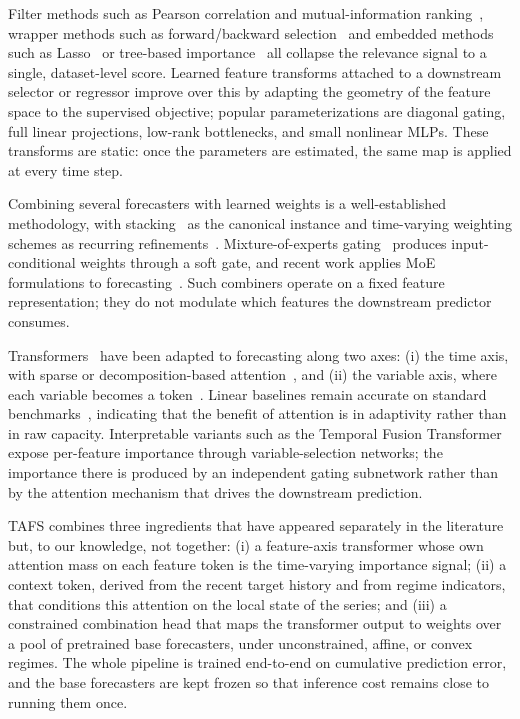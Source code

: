 \documentclass[journal]{IEEEtran}
\begin{document}
Filter methods such as Pearson correlation and mutual-information ranking~\cite{cover1991ifs}, wrapper methods such as forward/backward selection~\cite{guyon2003introfs} and embedded methods such as Lasso~\cite{tibshirani1996lasso} or tree-based importance~\cite{breiman2001randomforest} all collapse the relevance signal to a single, dataset-level score. Learned feature transforms attached to a downstream selector or regressor improve over this by adapting the geometry of the feature space to the supervised objective; popular parameterizations are diagonal gating, full linear projections, low-rank bottlenecks, and small nonlinear MLPs. These transforms are static: once the parameters are estimated, the same map is applied at every time step.

Combining several forecasters with learned weights is a well-established methodology, with stacking~\cite{wolpert1992stacking,breiman1996stacked} as the canonical instance and time-varying weighting schemes as recurring refinements~\cite{vilalta2002metalearning}. Mixture-of-experts gating~\cite{jacobs1991moe,shazeer2017moe} produces input-conditional weights through a soft gate, and recent work applies MoE formulations to forecasting~\cite{shi2024timemoe}. Such combiners operate on a fixed feature representation; they do not modulate which features the downstream predictor consumes.

Transformers~\cite{vaswani2017attention} have been adapted to forecasting along two axes: (i) the time axis, with sparse or decomposition-based attention~\cite{zhou2021informer,wu2021autoformer}, and (ii) the variable axis, where each variable becomes a token~\cite{liu2024itransformer,nie2023patchtst}. Linear baselines remain accurate on standard benchmarks~\cite{zeng2023dlinear}, indicating that the benefit of attention is in adaptivity rather than in raw capacity. Interpretable variants such as the Temporal Fusion Transformer~\cite{lim2021tft} expose per-feature importance through variable-selection networks; the importance there is produced by an independent gating subnetwork rather than by the attention mechanism that drives the downstream prediction.

TAFS combines three ingredients that have appeared separately in the literature but, to our knowledge, not together: (i) a feature-axis transformer whose own attention mass on each feature token is the time-varying importance signal; (ii) a context token, derived from the recent target history and from regime indicators, that conditions this attention on the local state of the series; and (iii) a constrained combination head that maps the transformer output to weights over a pool of pretrained base forecasters, under unconstrained, affine, or convex regimes. The whole pipeline is trained end-to-end on cumulative prediction error, and the base forecasters are kept frozen so that inference cost remains close to running them once.
\end{document}
